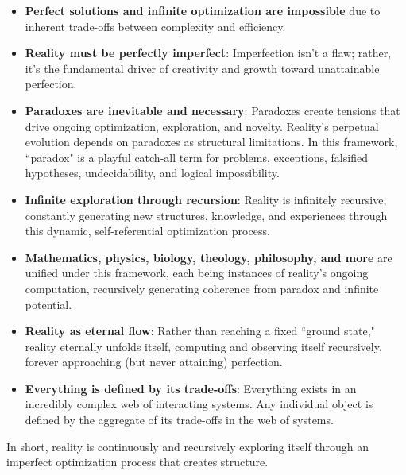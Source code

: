 \documentclass[12pt]{article}
\begin{document}
\begin{itemize}
    \item \textbf{Perfect solutions and infinite optimization are impossible} due to inherent trade-offs between complexity and efficiency.
    \item \textbf{Reality must be perfectly imperfect}: Imperfection isn't a flaw; rather, it's the fundamental driver of creativity and growth toward unattainable perfection.
    \item \textbf{Paradoxes are inevitable and necessary}: Paradoxes create tensions that drive ongoing optimization, exploration, and novelty. Reality's perpetual evolution depends on paradoxes as structural limitations. In this framework, ``paradox" is a playful catch-all term for problems, exceptions, falsified hypotheses, undecidability, and logical impossibility.
    \item \textbf{Infinite exploration through recursion}: Reality is infinitely recursive, constantly generating new structures, knowledge, and experiences through this dynamic, self-referential optimization process.
    \item \textbf{Mathematics, physics, biology, theology, philosophy, and more} are unified under this framework, each being instances of reality’s ongoing computation, recursively generating coherence from paradox and infinite potential.
    \item \textbf{Reality as eternal flow}: Rather than reaching a fixed ``ground state," reality eternally unfolds itself, computing and observing itself recursively, forever approaching (but never attaining) perfection.
    \item \textbf{Everything is defined by its trade-offs}: Everything exists in an incredibly complex web of interacting systems. Any individual object is defined by the aggregate of its trade-offs in the web of systems.
\end{itemize}

In short, reality is continuously and recursively exploring itself through an imperfect optimization process that creates structure.
\end{document}
